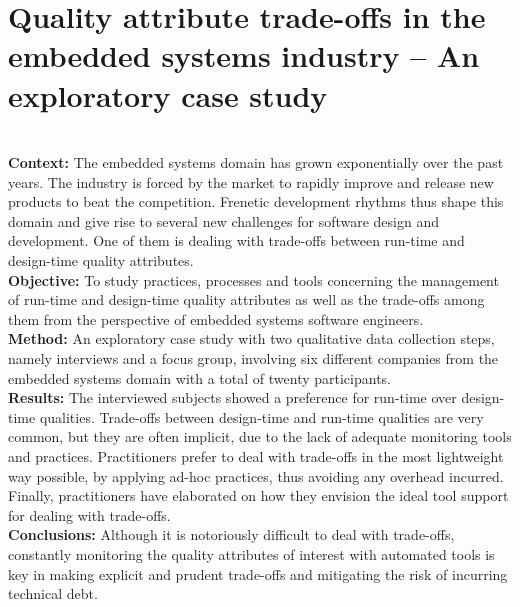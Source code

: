 \setlength{\headheight}{1.2cm}
\renewcommand{\publ}{\flushleft\footnotesize{Based on:\\[0.1cm]
		\textit{D. Sas, P. Avgeriou, Quality attribute trade-offs in the embedded systems industry: an exploratory case study. Software Quality Journal 28, 505-534 (2020). https://doi.org/10.1007/s11219-019-09478-x} \\[0.1cm]
}}

\chapter{Quality attribute trade-offs in the embedded systems industry -- An exploratory case study}
\label{chap:7}


\begin{Abstract}
    \textbf{\\Context: } The embedded systems domain has grown exponentially over the past years. The industry is forced by the market to rapidly improve and release new products to beat the competition. Frenetic development rhythms thus shape this domain and give rise to several new challenges for software design and development. One of them is dealing with trade-offs between run-time and design-time quality attributes.
    \\\textbf{Objective: } To study practices, processes and tools concerning the management of run-time and design-time quality attributes as well as the trade-offs among them from the perspective of embedded systems software engineers.
    \\\textbf{Method: } An exploratory case study with two qualitative data collection steps, namely interviews and a focus group, involving six different companies from the embedded systems domain with a total of twenty participants.
    \\\textbf{Results: } The interviewed subjects showed a preference for run-time over design-time qualities. Trade-offs between design-time and run-time qualities are very common, but they are often implicit, due to the lack of adequate monitoring tools and practices.
    Practitioners prefer to deal with trade-offs in the most lightweight way possible, by applying ad-hoc practices, thus avoiding any overhead incurred.
    Finally, practitioners have elaborated on how they envision the ideal tool support for dealing with trade-offs.
    \\\textbf{Conclusions: }
    Although it is notoriously difficult to deal with trade-offs, constantly monitoring the quality attributes of interest with automated tools is key in making explicit and prudent trade-offs and mitigating the risk of incurring technical debt.
\end{Abstract}


